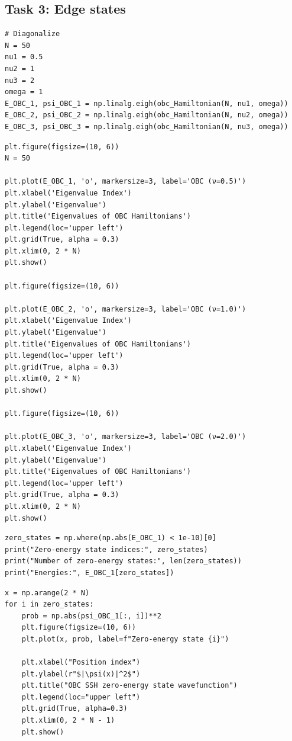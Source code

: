 \documentclass{report}
\begin{document}
\subsection*{Task 3: Edge states}

\begin{lstlisting}
# Diagonalize
N = 50
nu1 = 0.5
nu2 = 1
nu3 = 2
omega = 1
E_OBC_1, psi_OBC_1 = np.linalg.eigh(obc_Hamiltonian(N, nu1, omega))
E_OBC_2, psi_OBC_2 = np.linalg.eigh(obc_Hamiltonian(N, nu2, omega))
E_OBC_3, psi_OBC_3 = np.linalg.eigh(obc_Hamiltonian(N, nu3, omega))
\end{lstlisting}

\begin{lstlisting}
plt.figure(figsize=(10, 6))
N = 50

plt.plot(E_OBC_1, 'o', markersize=3, label='OBC (ν=0.5)')
plt.xlabel('Eigenvalue Index')
plt.ylabel('Eigenvalue')
plt.title('Eigenvalues of OBC Hamiltonians')
plt.legend(loc='upper left')
plt.grid(True, alpha = 0.3)
plt.xlim(0, 2 * N)
plt.show()

plt.figure(figsize=(10, 6))

plt.plot(E_OBC_2, 'o', markersize=3, label='OBC (ν=1.0)')
plt.xlabel('Eigenvalue Index')
plt.ylabel('Eigenvalue')
plt.title('Eigenvalues of OBC Hamiltonians')
plt.legend(loc='upper left')
plt.grid(True, alpha = 0.3)
plt.xlim(0, 2 * N)
plt.show()

plt.figure(figsize=(10, 6))

plt.plot(E_OBC_3, 'o', markersize=3, label='OBC (ν=2.0)')
plt.xlabel('Eigenvalue Index')
plt.ylabel('Eigenvalue')
plt.title('Eigenvalues of OBC Hamiltonians')
plt.legend(loc='upper left')
plt.grid(True, alpha = 0.3)
plt.xlim(0, 2 * N)
plt.show()
\end{lstlisting}

\begin{lstlisting}
zero_states = np.where(np.abs(E_OBC_1) < 1e-10)[0]
print("Zero-energy state indices:", zero_states)
print("Number of zero-energy states:", len(zero_states))
print("Energies:", E_OBC_1[zero_states])
\end{lstlisting}

\begin{lstlisting}
x = np.arange(2 * N)
for i in zero_states:
    prob = np.abs(psi_OBC_1[:, i])**2
    plt.figure(figsize=(10, 6))
    plt.plot(x, prob, label=f"Zero-energy state {i}")

    plt.xlabel("Position index")
    plt.ylabel(r"$|\psi(x)|^2$")
    plt.title("OBC SSH zero-energy state wavefunction")
    plt.legend(loc="upper left")
    plt.grid(True, alpha=0.3)
    plt.xlim(0, 2 * N - 1)
    plt.show()
\end{lstlisting}
\end{document}
